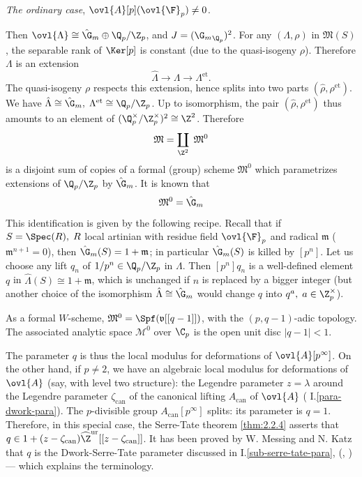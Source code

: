 \begin{para}\label{para:4.2.1}
 {\it The ordinary case}, \ie ${\ovl{A}}[p]({\ovl{\F}}_p)\neq 0$. 

 Then $\ovl{\Lambda}\cong\hat {\G}_m \oplus {\Q}_p/{\Z}_p$, and
 $J=({\G_m}_{{\Q}_p})^2$. For any $(\Lambda,\rho)$ in $\mathfrak{M}(S)$,
 the separable rank of $\Ker[p]$ is constant (due to the quasi-isogeny
 $\rho$). Therefore $\Lambda$ is an extension 
 \begin{equation*}
  \hat{\Lambda}\rightarrow \Lambda\rightarrow \Lambda^{\mathrm{et}}.
 \end{equation*}
 The quasi-isogeny $\rho$ respects this extension,
 hence splits into two parts $({\hat\rho},\rho^{\mathrm{et}})$. We have
 ${\hat\Lambda}\cong \hat {\G}_m ,\;\Lambda^{\mathrm{et}}\cong
 {\Q}_p/{\Z}_p$. Up to isomorphism, the pair
 $({\hat\rho},\rho^{\mathrm{et}})$ thus amounts to an element of
 $({\Q}_p^\times/{\Z}_p^\times)^2\cong {\Z}^2$. Therefore
 \begin{equation*}
  \mathfrak{M}=\coprod_{\Z^2}\;\mathfrak{M}^0
 \end{equation*}
 is a disjoint sum of copies of a formal (group) scheme
 $\mathfrak{M}^0$ which parametrizes extensions of ${\Q}_p/{\Z}_p$ by $
 \hat {\G}_m$. It is known that
 \begin{equation*}
  \mathfrak{M}^0 =\hat {\G}_m
 \end{equation*} 
 This identification is given by the
 following recipe. Recall that if $S=\Spec(R),\;R$ local artinian with
 residue field ${\ovl{\F}}_p$ and radical $\mathfrak{m}$
 ($\mathfrak{m}^{n+1}=0$), then $\hat {\G}_m(S)=1+\mathfrak{m}$; in
 particular $\hat {\G}_m(S)$ is killed by $[p^n]$. Let us choose any lift
 $q_n$ of $1/p^n\in {\Q}_p/{\Z}_p$ in $\Lambda$. Then $[p^n]q_n$ is a
 well-defined element $q$ in $ {\hat\Lambda}(S)\cong 1+\mathfrak{m}$,
 which is unchanged if $n$ is replaced by a bigger integer (but another
 choice of the isomorphism ${\hat\Lambda}\cong \hat {\G}_m$ would change
 $q$ into $q^a,\; a\in {\Z}_p^\times$).
 

 \noindent As a formal $W$-scheme, $\mathfrak{M}^0=
 \Spf(\mathfrak{v}[[q-1]])$, with the $(p,q-1)$-adic topology. 
 The associated analytic space $\mathcal{M}^0$ over $\C_p$ is the open
 unit disc $| q-1| <1$.
 
 The parameter $q$ is thus the local modulus for deformations of
 ${\ovl{A}}[p^\infty]$.  
 On the other hand, if
 $p\neq 2$, we have an algebraic local modulus for deformations of
 ${\ovl{A}}$ (say, with level two structure): the Legendre parameter
 $z=\lambda$ around the Legendre parameter $\zeta_{\mathrm{can}}$ of the
 canonical lifting $A_{\mathrm{can}}$ of ${\ovl{A}}$ (\cf 
 I.\ref{para-dwork-para}).
 The $p$-divisible group $A_{\mathrm{can}}[p^\infty]$ splits: its parameter is
 $q=1$. Therefore, in this special case, the Serre-Tate theorem \ref{thm:2.2.4}
 asserts that $q\in
 1+(z-\zeta_{\mathrm{can}}){\widehat{\Z}^{\mathrm{ur}}}[[z-\zeta_{\mathrm{can}}]]$. It has been
 proved by W. Messing and N. Katz that $q$ is the Dwork-Serre-Tate
 parameter discussed in I.\ref{sub-serre-tate-para}, 
 (\cite{q}, \cite{slm}) --- which explains the terminology.
\end{para}

